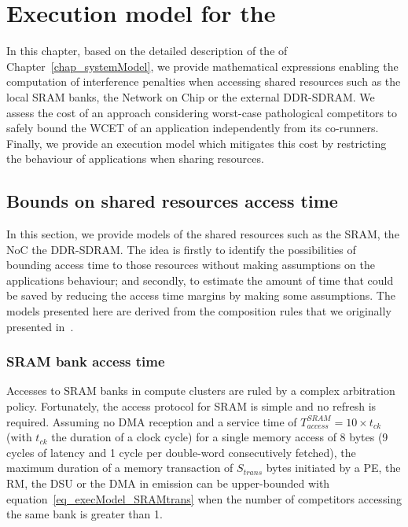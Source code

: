 \documentclass[main.tex]{subfiles}
\begin{document}
\chapter{Execution model for the \mppalong}
\thispagestyle{chapstyle}
\label{chap_execModel}
\minitoc

In this chapter, based on the detailed description of the \mppalong of
Chapter~\ref{chap_systemModel}, we provide mathematical expressions enabling
the computation of interference penalties when accessing shared resources such
as the local SRAM banks, the Network on Chip or the external DDR-SDRAM. We
assess the cost of an approach considering worst-case pathological competitors
to safely bound the WCET of an application independently from its co-runners.
Finally, we provide an execution model which mitigates this cost by restricting
the behaviour of applications when sharing resources.


\section{Bounds on shared resources access time}
\label{sec_execModel_boundsSharedRes}

In this section, we provide models of the shared resources such as the SRAM,
the NoC the DDR-SDRAM.  The idea is firstly to identify the possibilities of
bounding access time to those resources without making assumptions on the
applications behaviour; and secondly, to estimate the amount of time that could
be saved by reducing the access time margins by making some assumptions. The
models presented here are derived from the composition rules that we originally
presented in~\cite{Perret16}.


\subsection{SRAM bank access time} \label{ssec_execModel_SRAMaccessModel}
Accesses to SRAM banks in compute clusters are ruled by a complex arbitration
policy.  Fortunately, the access protocol for SRAM is simple and no refresh is
required. Assuming no DMA reception and a service time of $T_{access}^{SRAM} =
10 \times t_{ck}$ (with $t_{ck}$ the duration of a clock cycle) for a single
memory access of 8 bytes (9 cycles of latency and 1 cycle per double-word
consecutively fetched), the maximum duration of a memory transaction of
$S_{trans}$ bytes initiated by a PE, the RM, the DSU or the DMA in emission can
be upper-bounded with equation~\ref{eq_execModel_SRAMtrans} when the number of
competitors accessing the same bank is greater than 1. 
\end{document}
